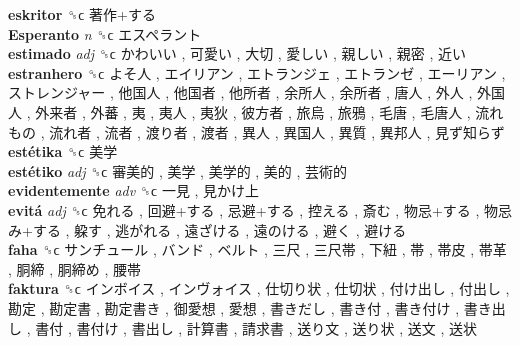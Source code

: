 \textbf{eskritor} ␝ϲ   著作+する   \\
\textbf{Esperanto} \emph{n}  ␝ϲ   エスペラント   \\
\textbf{estimado} \emph{adj}  ␝ϲ   かわいい ,  可愛い ,  大切 ,  愛しい ,  親しい ,  親密 ,  近い   \\
\textbf{estranhero} ␝ϲ   よそ人 ,  エイリアン ,  エトランジェ ,  エトランゼ ,  エーリアン ,  ストレンジャー ,  他国人 ,  他国者 ,  他所者 ,  余所人 ,  余所者 ,  唐人 ,  外人 ,  外国人 ,  外来者 ,  外蕃 ,  夷 ,  夷人 ,  夷狄 ,  彼方者 ,  旅烏 ,  旅鴉 ,  毛唐 ,  毛唐人 ,  流れもの ,  流れ者 ,  流者 ,  渡り者 ,  渡者 ,  異人 ,  異国人 ,  異質 ,  異邦人 ,  見ず知らず   \\
\textbf{estétika} ␝ϲ   美学   \\
\textbf{estétiko} \emph{adj}  ␝ϲ   審美的 ,  美学 ,  美学的 ,  美的 ,  芸術的   \\
\textbf{evidentemente} \emph{adv}  ␝ϲ   一見 ,  見かけ上   \\
\textbf{evitá} \emph{adj}  ␝ϲ   免れる ,  回避+する ,  忌避+する ,  控える ,  斎む ,  物忌+する ,  物忌み+する ,  躱す ,  逃がれる ,  遠ざける ,  遠のける ,  避く ,  避ける   \\
\textbf{faha} ␝ϲ   サンチュール ,  バンド ,  ベルト ,  三尺 ,  三尺帯 ,  下紐 ,  帯 ,  帯皮 ,  帯革 ,  胴締 ,  胴締め ,  腰帯   \\
\textbf{faktura} ␝ϲ   インボイス ,  インヴォイス ,  仕切り状 ,  仕切状 ,  付け出し ,  付出し ,  勘定 ,  勘定書 ,  勘定書き ,  御愛想 ,  愛想 ,  書きだし ,  書き付 ,  書き付け ,  書き出し ,  書付 ,  書付け ,  書出し ,  計算書 ,  請求書 ,  送り文 ,  送り状 ,  送文 ,  送状   \\
